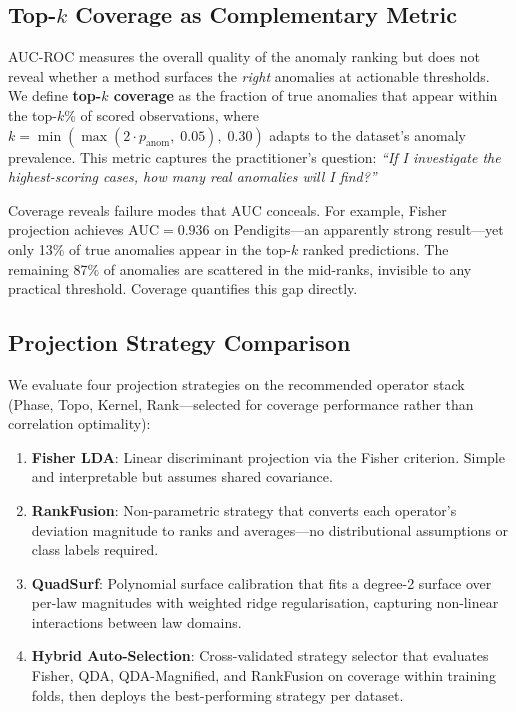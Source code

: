\documentclass[journal]{IEEEtran}
\begin{document}
\subsection{Top-$k$ Coverage as Complementary Metric}
\label{sssec:coverage}

AUC-ROC measures the overall quality of the anomaly ranking but does not reveal whether a method surfaces the \emph{right} anomalies at actionable thresholds. We define \textbf{top-$k$ coverage} as the fraction of true anomalies that appear within the top-$k$\% of scored observations, where $k = \min(\max(2 \cdot p_{\text{anom}},\; 0.05),\; 0.30)$ adapts to the dataset's anomaly prevalence. This metric captures the practitioner's question: \textit{``If I investigate the highest-scoring cases, how many real anomalies will I find?''}

Coverage reveals failure modes that AUC conceals. For example, Fisher projection achieves AUC${}= 0.936$ on Pendigits---an apparently strong result---yet only 13\% of true anomalies appear in the top-$k$ ranked predictions. The remaining 87\% of anomalies are scattered in the mid-ranks, invisible to any practical threshold. Coverage quantifies this gap directly.

\subsection{Projection Strategy Comparison}
\label{sssec:strategies}

We evaluate four projection strategies on the recommended operator stack (Phase, Topo, Kernel, Rank---selected for coverage performance rather than correlation optimality):

\begin{enumerate}[leftmargin=*]
  \item \textbf{Fisher LDA}: Linear discriminant projection via the Fisher criterion. Simple and interpretable but assumes shared covariance.
  \item \textbf{RankFusion}: Non-parametric strategy that converts each operator's deviation magnitude to ranks and averages---no distributional assumptions or class labels required.
  \item \textbf{QuadSurf}: Polynomial surface calibration that fits a degree-2 surface over per-law magnitudes with weighted ridge regularisation, capturing non-linear interactions between law domains.
  \item \textbf{Hybrid Auto-Selection}: Cross-validated strategy selector that evaluates Fisher, QDA, QDA-Magnified, and RankFusion on coverage within training folds, then deploys the best-performing strategy per dataset.
\end{enumerate}
\end{document}
